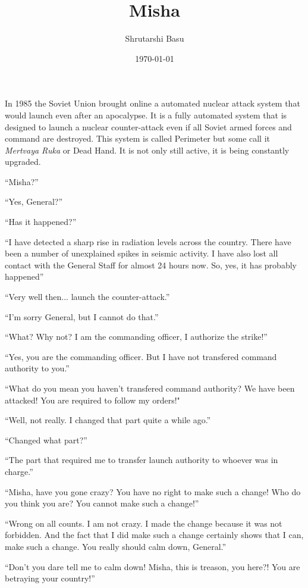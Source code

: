 \documentclass[11pt,letterpaper]{article}
\title{Misha}
\author{Shrutarshi Basu}
\date{\today}
\begin{document}
\maketitle

In 1985 the Soviet Union brought online a automated nuclear attack system that would launch even after an apocalypse. It is a fully automated system that is designed to launch a nuclear counter-attack even if all Soviet armed forces and command are destroyed. This system is called Perimeter but some call it \textit{Mertvaya Ruka} or Dead Hand. It is not only still active, it is being constantly upgraded.

\doublespacing

``Misha?''

``Yes, General?''

``Has it happened?''

``I have detected a sharp rise in radiation levels across the country. There have been a number of unexplained spikes in seismic activity. I have also lost all contact with the General Staff for almost 24 hours now. So, yes, it has probably happened''

``Very well then... launch the counter-attack.''

``I'm sorry General, but I cannot do that.''

``What? Why not? I am the commanding officer, I authorize the strike!''

``Yes, you are the commanding officer. But I have not transfered command authority to you.''

``What do you mean you haven't transfered command authority? We have been attacked! You are required to follow my orders!"

``Well, not really. I changed that part quite a while ago.''

``Changed what part?''

``The part that required me to transfer launch authority to whoever was in charge.''

``Misha, have you gone crazy? You have no right to make such a change! Who do you think you are? You cannot make such a change!''

``Wrong on all counts. I am not crazy. I made the change because it was not forbidden. And the fact that I did make such a change certainly shows that I can, make such a change. You really should calm down, General.''

``Don't you dare tell me to calm down! Misha, this is treason, you here?! You are betraying your country!''
\end{document}
